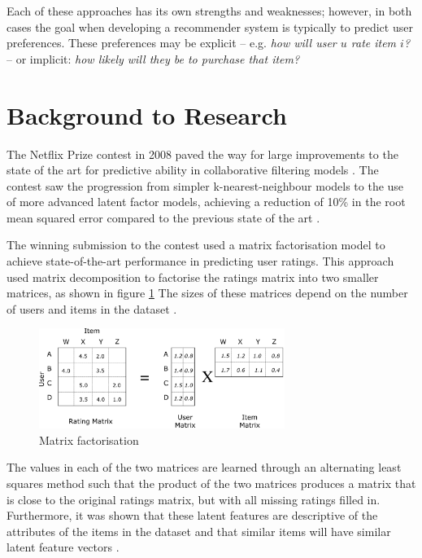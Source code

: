 Each of these approaches has its own strengths and weaknesses; however, in both cases the goal when developing a recommender system is typically to predict user preferences. These preferences may be explicit -- e.g. \textit{how will user $u$ rate item $i$?} -- or implicit: \textit{how likely will they be to purchase that item?}

\section{Background to Research}
The Netflix Prize contest in 2008 paved the way for large improvements to the state of the art for predictive ability in collaborative filtering models \parencite{netflix_description}. The contest saw the progression from simpler k-nearest-neighbour models to the use of more advanced latent factor models, achieving a reduction of 10\% in the root mean squared error compared to the previous state of the art \parencite{netflix_bellkor}.

The winning submission to the contest used a matrix factorisation model to achieve state-of-the-art performance in predicting user ratings. This approach used matrix decomposition to factorise the ratings matrix into two smaller matrices, as shown in figure \ref{fig:1_mat-fac} The sizes of these matrices depend on the number of users and items in the dataset \parencite{netflix_bellkor}.

\begin{figure}[H]
\centering
\includegraphics[width=8cm]{Figures/1_matrix-factorisation.png}
\decoRule
\caption[Matrix factorisation]{Matrix factorisation \parencite{liao2018towardsdatascience}}
\label{fig:1_mat-fac}
\end{figure}

The values in each of the two matrices are learned through an alternating least squares method such that the product of the two matrices produces a matrix that is close to the original ratings matrix, but with all missing ratings filled in. Furthermore, it was shown that these latent features are descriptive of the attributes of the items in the dataset and that similar items will have similar latent feature vectors \parencite{koren2009matrix}.

